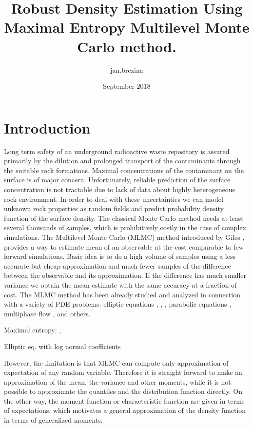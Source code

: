 \documentclass{article}
\title{Robust Density Estimation Using Maximal Entropy Multilevel Monte Carlo method. }
\author{jan.brezina }
\date{September 2018}
\begin{document}
\maketitle

\section{Introduction}
Long term safety of an underground radioactive waste repository is assured primarily by the dilution and 
prolonged transport of the contaminants through the suitable rock formations. Maximal concentrations of the contaminant on the surface is of major concern. Unfortunately, reliable prediction of the surface concentration is not tractable due to lack of data about highly heterogeneous rock environment. In order to deal with these uncertainties we can model unknown rock properties as random fields and predict probability density function of the surface density. 
The classical Monte Carlo method needs at least several thousands of samples, which is prohibitively costly in the case of complex simulations. The Multilevel Monte Carlo (MLMC) method introduced by Giles \cite{Giles2008}, \cite{Giles2015} provides a way to estimate mean of an observable at the cost comparable to few forward simulations. Basic idea is to do a high volume of samples using a less accurate but cheap approximation and much fewer samples of the difference between the observable and its approximation. If the difference has much smaller variance we obtain the mean estimate with the same accuracy at a fraction of cost.  The MLMC method has been already studied and analyzed in connection with a variety of PDE problems: elliptic equations \cite{Barth2011a}, \cite{Cliffe2011a}, \cite{Abdulle2013}, parabolic equations \cite{Barth2013},
multiphase flow \cite{Muller2013}, \cite{Lu2016} and others.


Maximal entropy:
\cite{Barron1991}, \cite{Bierig2016a}

Elliptic eq. with log normal coefficients \cite{Graham2015}






 However, the limitation is that MLMC can compute only approximation of expectation of any random variable. Therefore it is straight forward to make an approximation of the mean, the variance and other moments, while it is not possible to approximate the quantiles and the distribution function directly. On the other way, the moment function or characteristic function are given in terms of expectations, which motivates a general approximation of the density function in terms of generalized moments.
\end{document}

